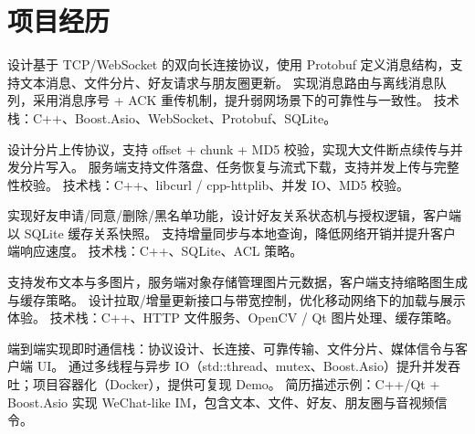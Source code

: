 \documentclass{resume}
\begin{document}
\section{项目经历}


\Content
{设计基于 TCP/WebSocket 的双向长连接协议，使用 Protobuf 定义消息结构，支持文本消息、文件分片、好友请求与朋友圈更新。}
{实现消息路由与离线消息队列，采用消息序号 + ACK 重传机制，提升弱网场景下的可靠性与一致性。}
{技术栈：C++、Boost.Asio、WebSocket、Protobuf、SQLite。}

\Content
{设计分片上传协议，支持 offset + chunk + MD5 校验，实现大文件断点续传与并发分片写入。}
{服务端支持文件落盘、任务恢复与流式下载，支持并发上传与完整性校验。}
{技术栈：C++、libcurl / cpp-httplib、并发 IO、MD5 校验。}

\Content
{实现好友申请/同意/删除/黑名单功能，设计好友关系状态机与授权逻辑，客户端以 SQLite 缓存关系快照。}
{支持增量同步与本地查询，降低网络开销并提升客户端响应速度。}
{技术栈：C++、SQLite、ACL 策略。}

\Content
{支持发布文本与多图片，服务端对象存储管理图片元数据，客户端支持缩略图生成与缓存策略。}
{设计拉取/增量更新接口与带宽控制，优化移动网络下的加载与展示体验。}
{技术栈：C++、HTTP 文件服务、OpenCV / Qt 图片处理、缓存策略。}

\Content
{端到端实现即时通信栈：协议设计、长连接、可靠传输、文件分片、媒体信令与客户端 UI。}
{通过多线程与异步 IO（std::thread、mutex、Boost.Asio）提升并发吞吐；项目容器化（Docker），提供可复现 Demo。}
{简历描述示例：C++/Qt + Boost.Asio 实现 WeChat-like IM，包含文本、文件、好友、朋友圈与音视频信令。}
\end{document}
